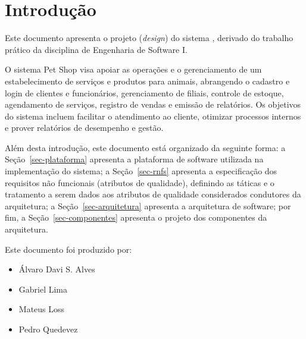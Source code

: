 \chapter{Introdução}
\label{sec-intro}
\vspace{-1cm}

Este documento apresenta o projeto (\textit{design}) do sistema \emph{\imprimirtitulo}, derivado do trabalho prático da disciplina de Engenharia de Software I.

O sistema Pet Shop visa apoiar as operações e o gerenciamento de um estabelecimento de serviços e produtos para animais, abrangendo o cadastro e login de clientes e funcionários, gerenciamento de filiais, controle de estoque, agendamento de serviços, registro de vendas e emissão de relatórios.
Os objetivos do sistema incluem facilitar o atendimento ao cliente, otimizar processos internos e prover relatórios de desempenho e gestão.

Além desta introdução, este documento está organizado da seguinte forma:
a Seção~\ref{sec-plataforma} apresenta a plataforma de software utilizada na implementação do sistema;
a Seção~\ref{sec-rnfs} apresenta a especificação dos requisitos não funcionais (atributos de qualidade), definindo as táticas e o tratamento a serem dados aos atributos de qualidade considerados condutores da arquitetura;
a Seção~\ref{sec-arquitetura} apresenta a arquitetura de software; por fim,
a Seção~\ref{sec-componentes} apresenta o projeto dos componentes da arquitetura.

Este documento foi produzido por:
\begin{itemize}
	\item Álvaro Davi S. Alves \
	\item Gabriel Lima \
	\item Mateus Loss \
	\item Pedro Quedevez \

\end{itemize}

